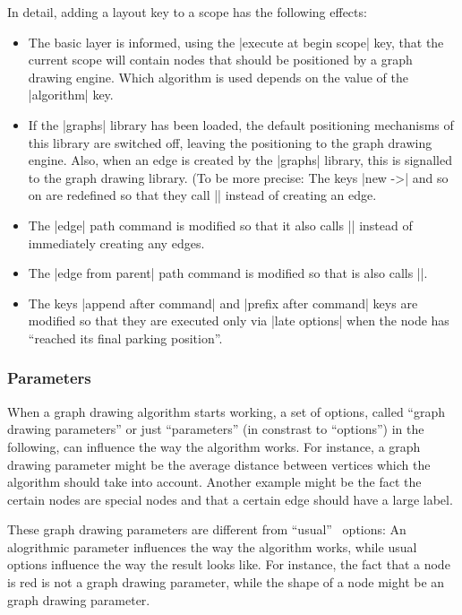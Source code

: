   In detail, adding a layout key to a scope has the following effects:
  \begin{itemize}
  \item The basic layer is informed, using the
    |execute at begin scope| key, that the current scope will contain
    nodes that should be positioned by a graph drawing engine. Which
    algorithm is used depends on the value of the |algorithm| key.
  \item If the |graphs| library has been loaded, the default
    positioning mechanisms of this library are switched off, leaving
    the positioning to the graph drawing engine. Also, when an edge is
    created by the |graphs| library, this is signalled to the graph
    drawing library. (To be more precise: The keys |new ->| and so on
    are redefined so that they call |\pgfgdedge| instead of creating
    an edge.
  \item The |edge| path command is modified so that it also calls
    |\pgfgdedge| instead of immediately creating any edges.
  \item The |edge from parent| path command is modified so that is
    also calls |\pgfgdedge|.
  \item The keys |append after command| and |prefix after command|
    keys are modified so that they are executed only via
    |late options| when the node has ``reached its final parking
    position''. 
  \end{itemize}


\subsubsection{Parameters}
\label{section-gd-parameters}

When a graph drawing algorithm starts working, a set of options,
called ``graph drawing parameters'' or just ``parameters'' (in
constrast to ``options'') in the following, can influence
the way the algorithm works. For instance, a graph drawing parameter
might be the average distance between vertices which the algorithm
should take into account. Another example might be the fact the
certain nodes are special nodes and that a certain edge should have
a large label.

These graph drawing parameters are different from ``usual'' \pgfname\
options: An alogrithmic parameter influences the way the algorithm
works, while usual options influence the way the result
looks like. For instance, the fact that a node is red is not a
graph drawing parameter, while the shape of a node might be an graph
drawing parameter. 


